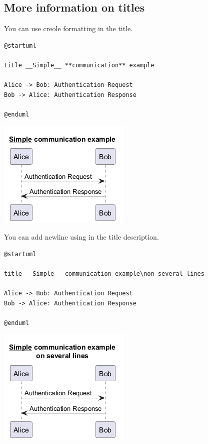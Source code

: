 \subsection{More information on titles}


You can use creole formatting in the title.


\begin{verbatim}
@startuml

title __Simple__ **communication** example

Alice -> Bob: Authentication Request
Bob -> Alice: Authentication Response

@enduml
\end{verbatim}
\begin{center}
\includegraphics[scale=0.60]{imgw/img-1121d5f5f9130f0ff9a0abdafbad0bcd.png}
\end{center}
You can add newline using \texttt{\textbackslashn} in the title description.
\begin{verbatim}
@startuml

title __Simple__ communication example\non several lines

Alice -> Bob: Authentication Request
Bob -> Alice: Authentication Response

@enduml
\end{verbatim}
\begin{center}
\includegraphics[scale=0.60]{imgw/img-79979f5af15b77af1d0985c873b87ebe.png}
\end{center}
